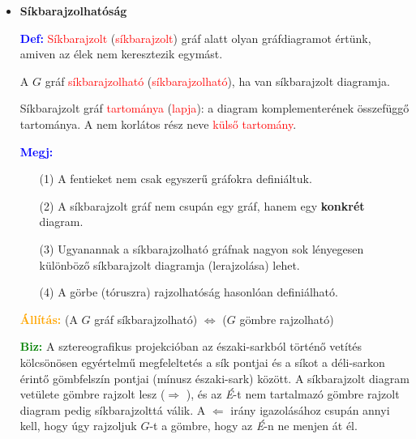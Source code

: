 \documentclass[../../szobeli.tex]{subfiles}
\begin{document}
\begin{center}
    \noindent{}
\end{center}

    \begin{itemize}
        \item \textbf{Síkbarajzolhatóság}

        \textcolor{blue}{\textbf{Def:}} \textcolor{red}{Síkbarajzolt} (\textcolor{red}{síkbarajzolt}) gráf alatt olyan gráfdiagramot értünk, amiven az  élek nem keresztezik egymást.

        A $G$ gráf \textcolor{red}{síkbarajzolható} (\textcolor{red}{síkbarajzolható}), ha van síkbarajzolt diagramja. 

        Síkbarajzolt gráf \textcolor{red}{tartománya} (\textcolor{red}{lapja}): a diagram komplementerének összefüggő tartománya. A nem korlátos rész neve \textcolor{red}{külső tartomány}. 

        \textcolor{blue}{\textbf{Megj:}} \begin{itemize}
            \item[(1)] A fentieket nem csak egyszerű gráfokra definiáltuk.
            \item[(2)] A síkbarajzolt gráf nem csupán egy gráf, hanem egy \textbf{konkrét} diagram. 
            \item[(3)] Ugyanannak a síkbarajzolható gráfnak nagyon sok lényegesen különböző síkbarajzolt diagramja (lerajzolása) lehet.
            \item[(4)] A görbe (tóruszra) rajzolhatóság hasonlóan definiálható.
        \end{itemize}

        \textcolor{orange}{\textbf{Állítás:}} (A $G$ gráf síkbarajzolható) $\Longleftrightarrow$ ($G$ gömbre rajzolható) 

        \textcolor{green}{\textbf{Biz:}} A sztereografikus projekcióban az északi-sarkból történő vetítés kölcsönösen egyértelmű megfeleltetés a sík pontjai és a síkot a déli-sarkon érintő gömbfelszín pontjai (mínusz északi-sark) között. A síkbarajzolt diagram vetülete gömbre rajzolt lesz ($\Rightarrow$ \checkmark), és az \textit{É}-t nem tartalmazó gömbre rajzolt diagram pedig síkbarajzolttá válik. A $\Leftarrow$ irány igazolásához csupán annyi kell, hogy úgy rajzoljuk $G$-t a gömbre, hogy az \textit{É}-n ne menjen át él. 


\end{itemize}
\end{document}
